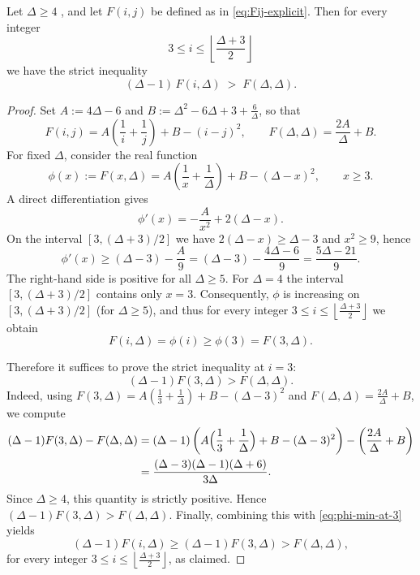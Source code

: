 \documentclass[preprint,12pt]{elsarticle}
\begin{document}
\begin{lemma}
\label{lem:Delta-1FiDelta}
Let $\Delta\ge 4$ , and let $F(i,j)$ be defined as in
\eqref{eq:Fij-explicit}. 
Then for every integer
\[
3 \le i \le \left\lfloor \frac{\Delta+3}{2} \right\rfloor
\]
we have the strict inequality
\[
(\Delta-1)\,F(i,\Delta)\;>\;F(\Delta,\Delta).
\]
\end{lemma}

\begin{proof}
Set $A:=4\Delta-6$ and $B:=\Delta^2-6\Delta+3+\frac{6}{\Delta}$, so that
\[
F(i,j)=A\left(\frac1i+\frac1j\right)+B-(i-j)^2,
\qquad
F(\Delta,\Delta)=\frac{2A}{\Delta}+B.
\]
For fixed $\Delta$, consider the real function
\[
\phi(x):=F(x,\Delta)=A\left(\frac1x+\frac1\Delta\right)+B-(\Delta-x)^2,
\qquad x\ge 3.
\]
A direct differentiation gives
\[
\phi'(x)=-\frac{A}{x^2}+2(\Delta-x).
\]
On the interval $[3,(\Delta+3)/2]$ we have $2(\Delta-x)\ge \Delta-3$ and $x^2\ge 9$, hence
\[
\phi'(x)\ge (\Delta-3)-\frac{A}{9}
=(\Delta-3)-\frac{4\Delta-6}{9}
=\frac{5\Delta-21}{9}.
\]
The right-hand side is positive for all $\Delta\ge 5$.
For $\Delta=4$ the interval $[3,(\Delta+3)/2]$ contains only $x=3$.
Consequently, $\phi$ is increasing on $[3,(\Delta+3)/2]$ (for $\Delta\ge 5$), and thus for every integer
$3\le i\le \left\lfloor \frac{\Delta+3}{2}\right\rfloor$ we obtain
\begin{equation}
\label{eq:phi-min-at-3}
F(i,\Delta)=\phi(i)\ge \phi(3)=F(3,\Delta).
\end{equation}

Therefore it suffices to prove the strict inequality at $i=3$:
\[
(\Delta-1)F(3,\Delta)>F(\Delta,\Delta).
\]
Indeed, using $F(3,\Delta)=A\left(\frac13+\frac1\Delta\right)+B-(\Delta-3)^2$ and
$F(\Delta,\Delta)=\frac{2A}{\Delta}+B$, we compute
\begin{align*}
(\Delta-1)F(3,\Delta)-F(\Delta,\Delta)
&=(\Delta-1)\left(A\Bigl(\frac13+\frac1\Delta\Bigr)+B-(\Delta-3)^2\right)-\left(\frac{2A}{\Delta}+B\right)\\
&=\frac{(\Delta-3)(\Delta-1)(\Delta+6)}{3\Delta}.
\end{align*}
Since $\Delta\ge 4$, this quantity is strictly positive. Hence $(\Delta-1)F(3,\Delta)>F(\Delta,\Delta)$.
Finally, combining this with \eqref{eq:phi-min-at-3} yields
\[
(\Delta-1)F(i,\Delta)\ge (\Delta-1)F(3,\Delta) > F(\Delta,\Delta),
\]
for every integer $3 \le i \le \left\lfloor \frac{\Delta+3}{2} \right\rfloor$, as claimed.
\end{proof}
\end{document}
